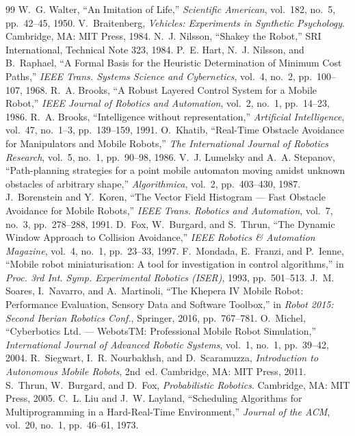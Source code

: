 \documentclass[11pt,a4paper]{article}
\begin{document}
\begin{thebibliography}{99}
 W.~G. Walter, ``An Imitation of Life,'' \emph{Scientific American}, vol.~182, no.~5, pp.~42--45, 1950.
 V.~Braitenberg, \emph{Vehicles: Experiments in Synthetic Psychology}. Cambridge, MA: MIT Press, 1984.
 N.~J. Nilsson, ``Shakey the Robot,'' SRI International, Technical Note 323, 1984.
 P.~E. Hart, N.~J. Nilsson, and B.~Raphael, ``A Formal Basis for the Heuristic Determination of Minimum Cost Paths,'' \emph{IEEE Trans. Systems Science and Cybernetics}, vol.~4, no.~2, pp.~100--107, 1968.
 R.~A. Brooks, ``A Robust Layered Control System for a Mobile Robot,'' \emph{IEEE Journal of Robotics and Automation}, vol.~2, no.~1, pp.~14--23, 1986.
 R.~A. Brooks, ``Intelligence without representation,'' \emph{Artificial Intelligence}, vol.~47, no.~1--3, pp.~139--159, 1991.
 O.~Khatib, ``Real-Time Obstacle Avoidance for Manipulators and Mobile Robots,'' \emph{The International Journal of Robotics Research}, vol.~5, no.~1, pp.~90--98, 1986.
 V.~J. Lumelsky and A.~A. Stepanov, ``Path-planning strategies for a point mobile automaton moving amidst unknown obstacles of arbitrary shape,'' \emph{Algorithmica}, vol.~2, pp.~403--430, 1987.
 J.~Borenstein and Y.~Koren, ``The Vector Field Histogram --- Fast Obstacle Avoidance for Mobile Robots,'' \emph{IEEE Trans. Robotics and Automation}, vol.~7, no.~3, pp.~278--288, 1991.
 D.~Fox, W.~Burgard, and S.~Thrun, ``The Dynamic Window Approach to Collision Avoidance,'' \emph{IEEE Robotics \& Automation Magazine}, vol.~4, no.~1, pp.~23--33, 1997.
 F.~Mondada, E.~Franzi, and P.~Ienne, ``Mobile robot miniaturisation: A tool for investigation in control algorithms,'' in \emph{Proc. 3rd Int. Symp. Experimental Robotics (ISER)}, 1993, pp.~501--513.
 J.~M. Soares, I.~Navarro, and A.~Martinoli, ``The Khepera IV Mobile Robot: Performance Evaluation, Sensory Data and Software Toolbox,'' in \emph{Robot 2015: Second Iberian Robotics Conf.}, Springer, 2016, pp.~767--781.
 O.~Michel, ``Cyberbotics Ltd. --- WebotsTM: Professional Mobile Robot Simulation,'' \emph{International Journal of Advanced Robotic Systems}, vol.~1, no.~1, pp.~39--42, 2004.
 R.~Siegwart, I.~R. Nourbakhsh, and D.~Scaramuzza, \emph{Introduction to Autonomous Mobile Robots}, 2nd~ed. Cambridge, MA: MIT Press, 2011.
 S.~Thrun, W.~Burgard, and D.~Fox, \emph{Probabilistic Robotics}. Cambridge, MA: MIT Press, 2005.
 C.~L. Liu and J.~W. Layland, ``Scheduling Algorithms for Multiprogramming in a Hard-Real-Time Environment,'' \emph{Journal of the ACM}, vol.~20, no.~1, pp.~46--61, 1973.
\end{thebibliography}
\end{document}
